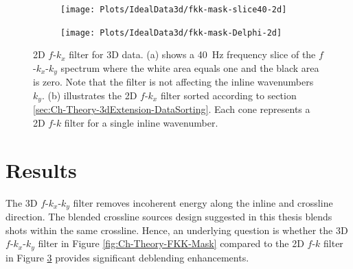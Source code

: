 \begin{figure}

	\centering 
	\begin{subfigure}[t]{0.45\textwidth}
		\centering
		\texttt{[image: Plots/IdealData3d/fkk-mask-slice40-2d]}
		\caption{}
		\label{fig:Ch-Mahdad3d-2dfk-slice}
	\end{subfigure}
	
	\par\bigskip
	
	\centering
	\begin{subfigure}[t]{\textwidth}
		\centering
		\texttt{[image: Plots/IdealData3d/fkk-mask-Delphi-2d]}
		\caption{}
		\label{fig:Ch-Mahdad3d-2dfk-Delphi}
	\end{subfigure}
	
	\caption{2D $f$-$k_x$ filter for 3D data. (a) shows a \SI{40}{\hertz} frequency slice of the $f$-$k_x$-$k_y$ spectrum where the white area equals one and the black area is zero. Note that the filter is not affecting the inline wavenumbers $k_y$. (b) illustrates the 2D $f$-$k_x$ filter sorted according to section \ref{sec:Ch-Theory-3dExtension-DataSorting}. Each cone represents a 2D $f$-$k$ filter for a single inline wavenumber.}
	\label{fig:Ch-Mahdad3d-2dfk}
\end{figure}

\section{Results}

The 3D $f$-$k_x$-$k_y$ filter removes incoherent energy along the inline and crossline direction. The blended crossline sources design suggested in this thesis blends shots within the same crossline. Hence, an underlying question is whether the 3D $f$-$k_x$-$k_y$ filter in Figure \ref{fig:Ch-Theory-FKK-Mask} compared to the 2D $f$-$k$ filter in Figure \ref{fig:Ch-Mahdad3d-2dfk} provides significant deblending enhancements.

